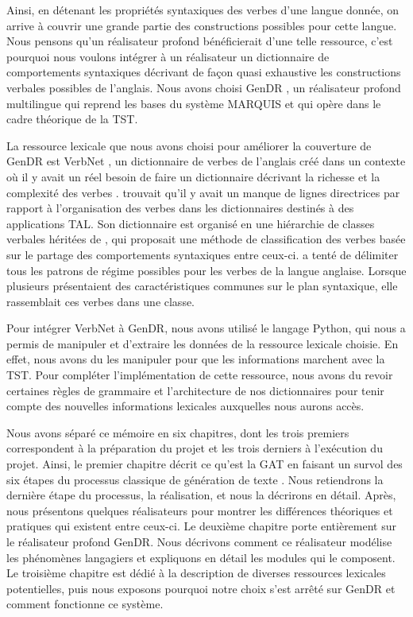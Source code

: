 Ainsi, en détenant les propriétés syntaxiques des verbes d'une langue donnée, on arrive à couvrir une grande partie des constructions possibles pour cette langue. Nous pensons qu'un réalisateur profond bénéficierait d'une telle ressource, c'est pourquoi nous voulons intégrer à un réalisateur un dictionnaire de comportements syntaxiques décrivant de façon quasi exhaustive les constructions verbales possibles de l'anglais. Nous avons choisi GenDR \citep{lareau18,lambrey15,LambreyGECOv1User2016,LambreyImplementationcollocationspour2017,dubinskaite17}, un réalisateur profond multilingue qui reprend les bases du système MARQUIS et qui opère dans le cadre théorique de la \ac{TST}.

La ressource lexicale que nous avons choisi pour améliorer la couverture de GenDR est VerbNet \citep{SchulerVerbnetBroadcoverageComprehensive2005}, un dictionnaire de verbes de l'anglais créé dans un contexte où il y avait un réel besoin de faire un dictionnaire décrivant la richesse et la complexité des verbes \citep{KipperClassBasedConstructionVerb2000}. \cite{SchulerVerbnetBroadcoverageComprehensive2005} trouvait qu'il y avait un manque de lignes directrices par rapport à l'organisation des verbes dans les dictionnaires destinés à des applications \ac{TAL}. Son dictionnaire est organisé en une hiérarchie de classes verbales héritées de \cite{verb-classes.levin.1993}, qui proposait une méthode de classification des verbes basée sur le partage des comportements syntaxiques entre ceux-ci. \citeauthor{verb-classes.levin.1993} a tenté de délimiter tous les patrons de régime possibles pour les verbes de la langue anglaise. Lorsque plusieurs présentaient des caractéristiques communes sur le plan syntaxique, elle rassemblait ces verbes dans une classe.

Pour intégrer VerbNet à GenDR, nous avons utilisé le langage Python, qui nous a permis de manipuler et d'extraire les données de la ressource lexicale choisie. En effet, nous avons du les manipuler pour que les informations marchent avec la \ac{TST}. Pour compléter l'implémentation de cette ressource, nous avons du revoir certaines règles de grammaire et l'architecture de nos dictionnaires pour tenir compte des nouvelles informations lexicales auxquelles nous aurons accès.

Nous avons séparé ce mémoire en six chapitres, dont les trois premiers correspondent à la préparation du projet et les trois derniers à l'exécution du projet. Ainsi, le premier chapitre décrit ce qu'est la \ac{GAT} en faisant un survol des six étapes du processus classique de génération de texte \citep{ReiterBuildingNaturalLanguage2000}. Nous retiendrons la dernière étape du processus, la réalisation, et nous la décrirons en détail. Après, nous présentons quelques réalisateurs pour montrer les différences théoriques et pratiques qui existent entre ceux-ci. Le deuxième chapitre porte entièrement sur le réalisateur profond GenDR. Nous décrivons comment ce réalisateur modélise les phénomènes langagiers et expliquons en détail les modules qui le composent. Le troisième chapitre est dédié à la description de diverses ressources lexicales potentielles, puis nous exposons pourquoi notre choix s'est arrêté sur GenDR et comment fonctionne ce système.

